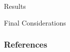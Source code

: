 \documentclass[8pt]{beamer}
\begin{document}
\begin{frame}{Results}
\end{frame}

\begin{frame}{Final Considerations}
\end{frame}

\begin{frame}
    \frametitle{References}
    \printbibliography
\end{frame}
\end{document}
